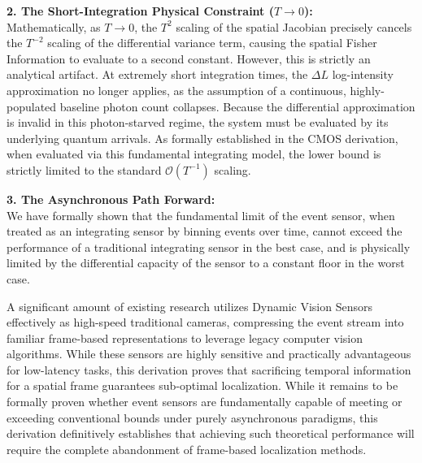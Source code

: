 \documentclass[11pt]{article}
\begin{document}
\vspace{0.5em}
\noindent \textbf{2. The Short-Integration Physical Constraint ($T \to 0$):} \\
Mathematically, as $T \to 0$, the $T^2$ scaling of the spatial Jacobian precisely cancels the $T^{-2}$ scaling of the differential variance term, causing the spatial Fisher Information to evaluate to a second constant. However, this is strictly an analytical artifact. At extremely short integration times, the $\Delta L$ log-intensity approximation no longer applies, as the assumption of a continuous, highly-populated baseline photon count collapses. Because the differential approximation is invalid in this photon-starved regime, the system must be evaluated by its underlying quantum arrivals. As formally established in the CMOS derivation, when evaluated via this fundamental integrating model, the lower bound is strictly limited to the standard $\mathcal{O}(T^{-1})$ scaling.

\vspace{0.5em}
\noindent \textbf{3. The Asynchronous Path Forward:} \\
We have formally shown that the fundamental limit of the event sensor, when treated as an integrating sensor by binning events over time, cannot exceed the performance of a traditional integrating sensor in the best case, and is physically limited by the differential capacity of the sensor to a constant floor in the worst case.

A significant amount of existing research utilizes Dynamic Vision Sensors effectively as high-speed traditional cameras, compressing the event stream into familiar frame-based representations to leverage legacy computer vision algorithms. While these sensors are highly sensitive and practically advantageous for low-latency tasks, this derivation proves that sacrificing temporal information for a spatial frame guarantees sub-optimal localization. While it remains to be formally proven whether event sensors are fundamentally capable of meeting or exceeding conventional bounds under purely asynchronous paradigms, this derivation definitively establishes that achieving such theoretical performance will require the complete abandonment of frame-based localization methods.



\end{document}
